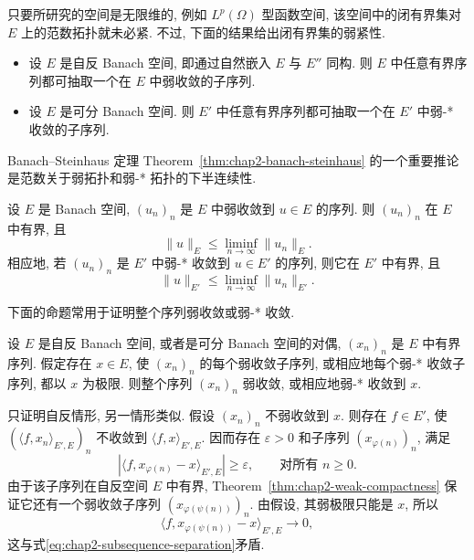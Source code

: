 只要所研究的空间是无限维的, 例如 $L^p(\Omega)$ 型函数空间, 该空间中的闭有界集对 $E$ 上的范数拓扑就未必紧. 不过, 下面的结果给出闭有界集的弱紧性.

\begin{Theorem}
\label{thm:chap2-weak-compactness}
\begin{itemize}
\item 设 $E$ 是自反 Banach 空间, 即通过自然嵌入 $E$ 与 $E''$ 同构. 则 $E$ 中任意有界序列都可抽取一个在 $E$ 中弱收敛的子序列.
\item 设 $E$ 是可分 Banach 空间. 则 $E'$ 中任意有界序列都可抽取一个在 $E'$ 中弱-* 收敛的子序列.
\end{itemize}
\end{Theorem}

Banach--Steinhaus 定理 Theorem~\ref{thm:chap2-banach-steinhaus} 的一个重要推论是范数关于弱拓扑和弱-* 拓扑的下半连续性.

\begin{Corollary}
\label{cor:chap2-weak-lower-semicontinuity}
设 $E$ 是 Banach 空间, $(u_n)_n$ 是 $E$ 中弱收敛到 $u\in E$ 的序列. 则 $(u_n)_n$ 在 $E$ 中有界, 且
\[
  \|u\|_E\leq\liminf_{n\to\infty}\|u_n\|_E.
\]
相应地, 若 $(u_n)_n$ 是 $E'$ 中弱-* 收敛到 $u\in E'$ 的序列, 则它在 $E'$ 中有界, 且
\[
  \|u\|_{E'}\leq\liminf_{n\to\infty}\|u_n\|_{E'}.
\]
\end{Corollary}

下面的命题常用于证明整个序列弱收敛或弱-* 收敛.

\begin{Proposition}
\label{prop:chap2-unique-subsequence-limit}
设 $E$ 是自反 Banach 空间, 或者是可分 Banach 空间的对偶, $(x_n)_n$ 是 $E$ 中有界序列. 假定存在 $x\in E$, 使 $(x_n)_n$ 的每个弱收敛子序列, 或相应地每个弱-* 收敛子序列, 都以 $x$ 为极限. 则整个序列 $(x_n)_n$ 弱收敛, 或相应地弱-* 收敛到 $x$.
\end{Proposition}

\begin{Proof}
只证明自反情形, 另一情形类似. 假设 $(x_n)_n$ 不弱收敛到 $x$. 则存在 $f\in E'$, 使 $(\langle f,x_n\rangle_{E',E})_n$ 不收敛到 $\langle f,x\rangle_{E',E}$. 因而存在 $\varepsilon>0$ 和子序列 $(x_{\varphi(n)})_n$, 满足
\begin{equation}
\label{eq:chap2-subsequence-separation}
  |\langle f,x_{\varphi(n)}-x\rangle_{E',E}|\geq\varepsilon,
  \qquad\text{对所有 $n\geq0$}.
\end{equation}
由于该子序列在自反空间 $E$ 中有界, Theorem~\ref{thm:chap2-weak-compactness} 保证它还有一个弱收敛子序列 $(x_{\varphi(\psi(n))})_n$. 由假设, 其弱极限只能是 $x$, 所以
\[
  \langle f,x_{\varphi(\psi(n))}-x\rangle_{E',E}\longrightarrow0,
\]
这与式\eqref{eq:chap2-subsequence-separation}矛盾.
\end{Proof}

